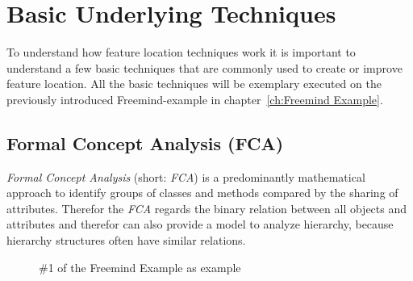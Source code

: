 \chapter{Basic Underlying Techniques}

To understand how feature location techniques work it is important to understand a few basic techniques that are commonly used to create or improve feature location. All the basic techniques  will be exemplary executed on the previously introduced Freemind-example in chapter~\ref{ch:Freemind Example}.

\section{Formal Concept Analysis (FCA)}
\emph{Formal Concept Analysis} (short: \emph{FCA}) is a predominantly mathematical approach to identify groups of classes and methods compared by the sharing of attributes. Therefor the \emph{FCA} regards the binary relation between all objects and attributes and therefor can also provide a model to analyze hierarchy, because hierarchy structures often have similar relations. 
\begin{figure}
  \caption{\#1 of the Freemind Example as example}
  \label{flowchart}
\end{figure}


